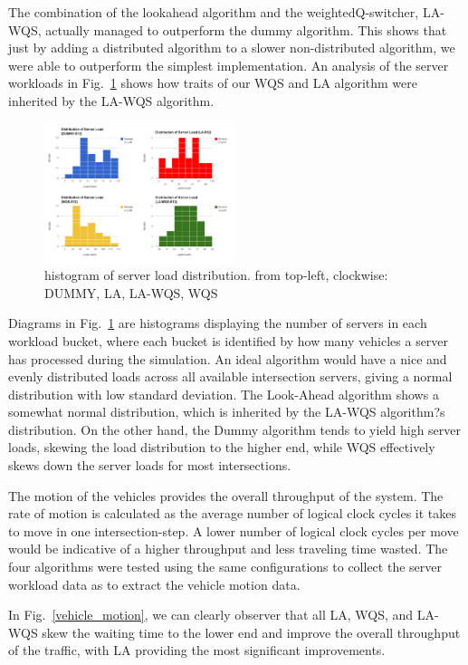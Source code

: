\documentclass[conference]{IEEEtran}
\begin{document}
The combination of the lookahead algorithm and the weightedQ-switcher, LA-WQS, actually managed to outperform the dummy algorithm. This shows that just by adding a distributed algorithm to a slower non-distributed algorithm, we were able to outperform the simplest implementation. An analysis of the server workloads in Fig.~\ref{intersection_load} shows how traits of our WQS and LA algorithm were inherited by the LA-WQS algorithm.


\begin{figure}[h]
    \center    
    \includegraphics[width=0.5\textwidth]{images/intersection_load.png}
	\caption{histogram of server load distribution. from top-left, clockwise: DUMMY, LA, LA-WQS, WQS}
	\label{intersection_load}
\end{figure}


Diagrams in Fig.~\ref{intersection_load} are histograms displaying the number of servers in each workload bucket, where each bucket is identified by how many vehicles a server has processed during the simulation. An ideal algorithm would have a nice and evenly distributed loads across all available intersection servers, giving a normal distribution with low standard deviation. The Look-Ahead algorithm shows a somewhat normal distribution, which is inherited by the LA-WQS algorithm?s distribution. On the other hand, the Dummy algorithm tends to yield high server loads, skewing the load distribution to the higher end, while WQS effectively skews down the server loads for most intersections.

The motion of the vehicles provides the overall throughput of the system. The rate of motion is calculated as the average number of logical clock cycles it takes to move in one intersection-step. A lower number of logical clock cycles per move would be indicative of a higher throughput and less traveling time wasted. The four algorithms were tested using the same configurations to collect the server workload data as to extract the vehicle motion data.

In Fig.~\ref{vehicle_motion}, we can clearly observer that all LA, WQS, and LA-WQS skew the waiting time to the lower end and improve the overall throughput of the traffic, with LA providing the most significant improvements.
\end{document}
